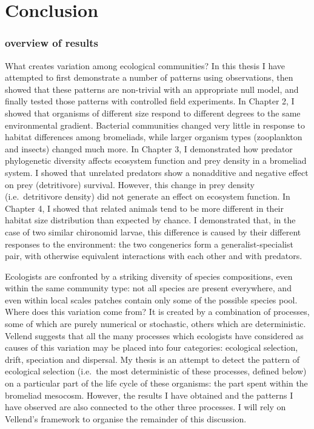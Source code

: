 \chapter{Conclusion}
\label{chap:conclusions}

\subsection{overview of results}\label{overview-of-results}

What creates variation among ecological communities? In this thesis I
have attempted to first demonstrate a number of patterns using
observations, then showed that these patterns are non-trivial with an
appropriate null model, and finally tested those patterns with
controlled field experiments. In Chapter 2, I showed that organisms of
different size respond to different degrees to the same environmental
gradient. Bacterial communities changed very little in response to
habitat differences among bromeliads, while larger organism types
(zooplankton and insects) changed much more. In Chapter 3, I
demonstrated how predator phylogenetic diversity affects ecosystem
function and prey density in a bromeliad system. I showed that unrelated
predators show a nonadditive and negative effect on prey (detritivore)
survival. However, this change in prey density (i.e.~detritivore
density) did not generate an effect on ecosystem function. In Chapter 4,
I showed that related animals tend to be more different in their habitat
size distribution than expected by chance. I demonstrated that, in the
case of two similar chironomid larvae, this difference is caused by
their different responses to the environment: the two congenerics form a
generalist-specialist pair, with otherwise equivalent interactions with
each other and with predators.

Ecologists are confronted by a striking diversity of species
compositions, even within the same community type: not all species are
present everywhere, and even within local scales patches contain only
some of the possible species pool. Where does this variation come from?
It is created by a combination of processes, some of which are purely
numerical or stochastic, others which are deterministic. Vellend
\citep{vellendbook} suggests that all the many processes which
ecologists have considered as causes of this variation may be placed
into four categories: ecological selection, drift, speciation and
dispersal. My thesis is an attempt to detect the pattern of ecological
selection (i.e.~the most deterministic of these processes, defined
below) on a particular part of the life cycle of these organisms: the
part spent within the bromeliad mesocosm. However, the results I have
obtained and the patterns I have observed are also connected to the
other three processes. I will rely on Vellend's framework to organise
the remainder of this discussion.

